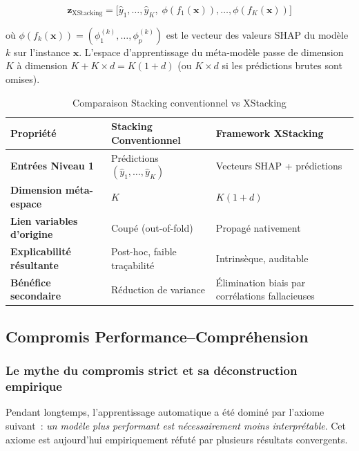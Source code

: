 \begin{equation}
  \mathbf{z}_{\text{XStacking}} = \bigl[\hat{y}_1, \ldots, \hat{y}_K,\;
  \phi(f_1(\mathbf{x})), \ldots, \phi(f_K(\mathbf{x}))\bigr]
  \label{eq:xstacking}
\end{equation}

où $\phi(f_k(\mathbf{x})) = (\phi_1^{(k)}, \ldots, \phi_p^{(k)})$ est le vecteur des valeurs
SHAP du modèle $k$ sur l'instance $\mathbf{x}$. L'espace d'apprentissage du méta-modèle passe
de dimension $K$ à dimension $K + K \times d = K(1+d)$ (ou $K \times d$ si les prédictions
brutes sont omises).

\begin{table}[H]
\centering
\caption{Comparaison Stacking conventionnel vs XStacking}
\renewcommand{\arraystretch}{1.4}
\begin{tabular}{>{\bfseries}p{4cm} p{4.5cm} p{4.5cm}}
\toprule
Propriété & Stacking Conventionnel & Framework XStacking \\
\midrule
Entrées Niveau 1 & Prédictions $(\hat{y}_1, \ldots, \hat{y}_K)$ & Vecteurs SHAP + prédictions \\
Dimension méta-espace & $K$ & $K(1 + d)$ \\
Lien variables d'origine & Coupé (out-of-fold) & Propagé nativement \\
Explicabilité résultante & Post-hoc, faible traçabilité & Intrinsèque, auditable \\
Bénéfice secondaire & Réduction de variance & Élimination biais par corrélations fallacieuses \\
\bottomrule
\end{tabular}
\label{tab:stacking_vs_xstacking}
\end{table}

\subsection{Compromis Performance–Compréhension}

\subsubsection{Le mythe du compromis strict et sa déconstruction empirique}

Pendant longtemps, l'apprentissage automatique a été dominé par l'axiome suivant~:
\textit{un modèle plus performant est nécessairement moins interprétable}. Cet axiome
est aujourd'hui empiriquement réfuté par plusieurs résultats convergents.


